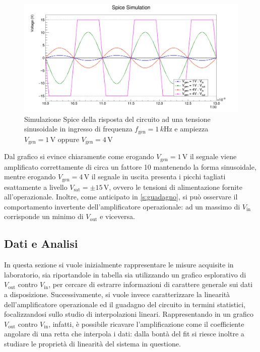 \documentclass[a4paper,11pt]{article} %
\begin{document}
\begin{figure}[H]
	\centering
	\includegraphics[width=15cm]{../Plots/Report_Plots/opamp_spice_1V_4V.png}
	\caption{Simulazione Spice della risposta del circuito ad una tensione sinusoidale in ingresso di frequenza
	$f_{\text{gen}}=1\,\si{k\hertz}$ e ampiezza $V_{\text{gen}}=1\,\si{\volt}$ oppure $V_{\text{gen}}=4\,\si{\volt}$}
	\label{i:opamp_simulation}
\end{figure}

\noindent Dal grafico si evince chiaramente come erogando $V_{\text{gen}}=1\,\si{\volt}$ il segnale viene amplificato
correttamente di circa un fattore 10 mantenendo la forma sinusoidale, mentre erogando $V_{\text{gen}}=4\,\si{\volt}$ il
segnale in uscita presenta i picchi tagliati esattamente a livello $V_{\text{sat}}=\pm 15\,\si{\volt}$, ovvero le
tensioni di alimentazione fornite all'operazionale. Inoltre, come anticipato in \autoref{s:guadagno}, si può osservare
il comportamento invertente dell'amplificatore operazionale: ad un massimo di $V_{\text{in}}$ corrisponde un minimo di
$V_{\text{out}}$ e viceversa.\\



\subsection{Dati e Analisi}
In questa sezione si vuole inizialmente rappresentare le misure acquisite in laboratorio, sia riportandole in tabella
sia utilizzando un grafico esplorativo di $V_{\text{out}}$ contro $V_{\text{in}}$, per cercare di estrarre informazioni
di carattere generale sui dati a disposizione. Successivamente, si vuole invece caratterizzare la linearità
dell'amplificatore operazionale ed il guadagno del circuito in termini statistici, focalizzandosi sullo studio di
interpolazioni lineari. Rappresentando in un grafico $V_{\text{out}}$ contro $V_{\text{in}}$, infatti, è possibile
ricavare l'amplificazione come il coefficiente angolare di una retta che interpola i dati: dalla bontà del fit si riesce
inoltre a studiare le proprietà di linearità del sistema in questione.
\end{document}
